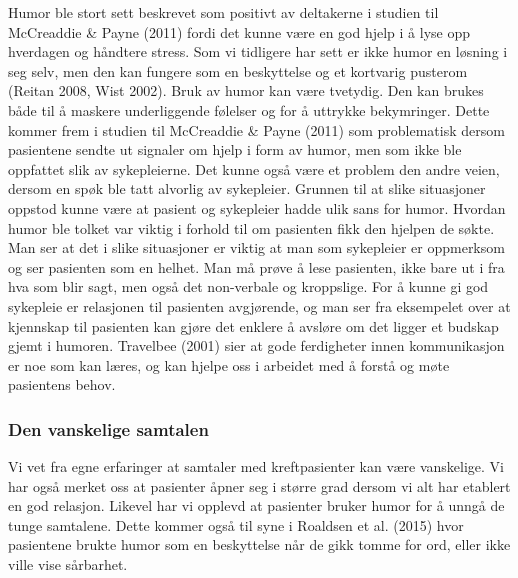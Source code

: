 Humor ble stort sett beskrevet som positivt av deltakerne i studien til
McCreaddie \&{} Payne (2011) fordi det kunne være en god hjelp i å lyse opp
hverdagen og håndtere stress. Som vi tidligere har sett er ikke humor en
løsning i seg selv, men den kan fungere som en beskyttelse og et kortvarig
pusterom (Reitan 2008, Wist 2002). Bruk av humor kan være tvetydig. Den kan
brukes både til å maskere underliggende følelser og for å uttrykke bekymringer.
Dette kommer frem i studien til McCreaddie \&{} Payne (2011) som problematisk
dersom pasientene sendte ut signaler om hjelp i form av humor, men som ikke ble
oppfattet slik av sykepleierne. Det kunne også være et problem den andre veien,
dersom en spøk ble tatt alvorlig av sykepleier. Grunnen til at slike
situasjoner oppstod kunne være at pasient og sykepleier hadde ulik sans for
humor. Hvordan humor ble tolket var viktig i forhold til om pasienten fikk den
hjelpen de søkte. Man ser at det i slike situasjoner er viktig at man som
sykepleier er oppmerksom og ser pasienten som en helhet. Man må prøve å lese
pasienten, ikke bare ut i fra hva som blir sagt, men også det non-verbale og
kroppslige. For å kunne gi god sykepleie er relasjonen til pasienten
avgjørende, og man ser fra eksempelet over at kjennskap til pasienten kan gjøre
det enklere å avsløre om det ligger et budskap gjemt i humoren. Travelbee
(2001) sier at gode ferdigheter innen kommunikasjon er noe som kan læres, og
kan hjelpe oss i arbeidet med å forstå og møte pasientens behov.

\subsubsection{Den vanskelige samtalen}

Vi vet fra egne erfaringer at samtaler med kreftpasienter kan være vanskelige.
Vi har også merket oss at pasienter åpner seg i større grad dersom vi alt har
etablert en god relasjon. Likevel har vi opplevd at pasienter bruker humor for
å unngå de tunge samtalene. Dette kommer også til syne i Roaldsen et al. (2015)
hvor pasientene brukte humor som en beskyttelse når de gikk tomme for ord,
eller ikke ville vise sårbarhet.

